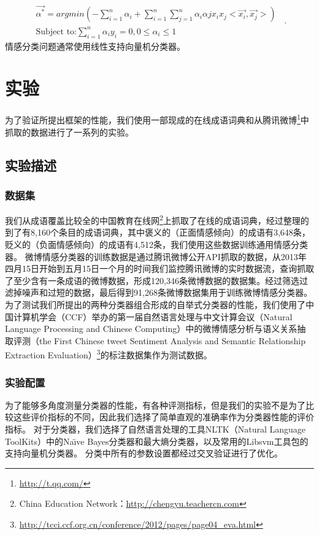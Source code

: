 \begin{equation}
\label{e7}
\begin{aligned}
\overrightarrow{\alpha^{\ast}}=argmin \left( -\sum_{i=1}^{n}\alpha_{i} + \sum_{i=1}^{n} \sum_{j=1}^{n}\alpha_{i}\alpha{j} x_{i}x_{j}<\overrightarrow{x_{i}},\overrightarrow{x_{j}}> \right)\\
\mbox{Subject to:} \sum_{i=1}^{n}\alpha_{i}y_{i}=0 , 0\leqslant \alpha_{i} \leqslant 1
\end{aligned} \enspace .
\end{equation}
情感分类问题通常使用线性支持向量机分类器。

\section{实验}
\label{experiment}
为了验证所提出框架的性能，我们使用一部现成的在线成语词典和从腾讯微博\footnote{\url{http://t.qq.com/}}中抓取的数据进行了一系列的实验。

\subsection{实验描述}
\label{description}

\subsubsection{数据集}
我们从成语覆盖比较全的中国教育在线网\footnote{China Education Network：\url{http://chengyu.teachercn.com}}上抓取了在线的成语词典，经过整理的到了有8,160个条目的成语词典，其中褒义的（正面情感倾向）的成语有3,648条，贬义的（负面情感倾向）的成语有4,512条，我们使用这些数据训练通用情感分类器。
微博情感分类器的训练数据是通过腾讯微博公开API抓取的数据，从2013年四月15日开始到五月15日一个月的时间我们监控腾讯微博的实时数据流，查询抓取了至少含有一条成语的微博数据，形成120,346条微博数据的数据集。经过筛选过滤掉噪声和过短的数据，最后得到91,268条微博数据集用于训练微博情感分类器。
为了测试我们所提出的两种分类器组合形成的自举式分类器的性能，我们使用了中国计算机学会（CCF）举办的第一届自然语言处理与中文计算会议（Natural Language Processing and Chinese Computing）中的微博情感分析与语义关系抽取评测（the First Chinese tweet Sentiment Analysis and Semantic Relationship Extraction Evaluation）\footnote{\url{http://tcci.ccf.org.cn/conference/2012/pages/page04_eva.html}}的标注数据集作为测试数据。
 
\subsubsection{实验配置}
为了能够多角度测量分类器的性能，有各种评测指标，但是我们的实验不是为了比较这些评价指标的不同，因此我们选择了简单直观的准确率作为分类器性能的评价指标。
对于分类器，我们选择了自然语言处理的工具NLTK（Natural Language ToolKits）中的Na\"\i ve Bayes分类器和最大熵分类器，以及常用的Libsvm工具包的支持向量机分类器。
分类中所有的参数设置都经过交叉验证进行了优化。

